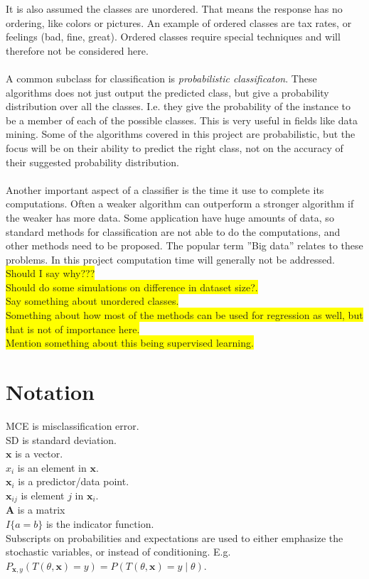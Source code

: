 It is also assumed the classes are unordered. That means the response has no ordering, like colors or pictures. An example of ordered classes are tax rates, or feelings (bad, fine, great). Ordered classes require special techniques and will therefore not be considered here. 
\\
\\
A common subclass for classification is \textit{probabilistic classificaton}. These algorithms does not just output the predicted class, but give a probability distribution over all the classes. I.e. they give the probability of the instance to be a member of each of the possible classes. This is very useful in fields like data mining. 
Some of the algorithms covered in this project are probabilistic, but the focus will be on their ability to predict the right class, not on the accuracy of their suggested probability distribution.
\\
\\
Another important aspect of a classifier is the time it use to complete its computations. Often a weaker algorithm can outperform a stronger algorithm if the weaker has more data. Some application have huge amounts of data, so standard methods for classification are not able to do the computations, and other methods need to be proposed. The popular term ''Big data'' relates to these problems. In this project computation time will generally not be addressed. \colorbox{yellow}{Should I say why???}
\\

\colorbox{yellow}{Should do some simulations on difference in dataset size?.}\\
\colorbox{yellow}{Say something about unordered classes.}\\
\colorbox{yellow}{Something about how most of the methods can be used for regression as well, but that is not of importance here.}\\
\colorbox{yellow}{Mention something about this being supervised learning.}



\section{Notation}
\label{sec:Notation}
MCE is misclassification error. \\
SD is standard deviation. \\
$\mathbf{x}$ is a vector. \\
$x_i$ is an element in $\mathbf{x}$. \\
$\mathbf{x}_i$ is a predictor/data point.  \\
$\mathbf{x}_{ij}$ is element $j$ in $\mathbf{x}_i$. \\
$\mathbf{A}$ is a matrix \\
$I\{a = b\}$ is the indicator function.\\
Subscripts on probabilities and expectations are used to either emphasize the stochastic variables, or instead of conditioning. 
E.g. $P_{\mathbf{x}, y}(T(\theta, \mathbf{x}) = y) = P(T(\theta, \mathbf{x}) = y \mid \theta)$.


